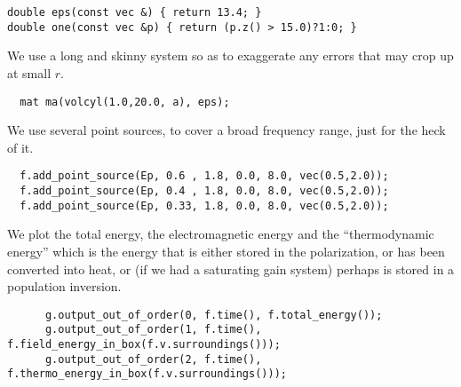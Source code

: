 \begin{verbatim}
double eps(const vec &) { return 13.4; }
double one(const vec &p) { return (p.z() > 15.0)?1:0; }
\end{verbatim}
\begin{comment}
int main(int argc, char **argv) {
  initialize mpi(argc, argv);
  deal_with_ctrl_c();
  const double ttot = 600.0;
\end{comment}
We use a long and skinny system so as to exaggerate any errors that may
crop up at small $r$.
\begin{verbatim}
  mat ma(volcyl(1.0,20.0, a), eps);
\end{verbatim}
\begin{comment}
  const char *dirname = make_output_directory(__FILE__);
  ma.set_output_directory(dirname);
  ma.add_polarizability(one, 0.25, 0.1, 3.0);
  fields f(&ma);
  grace g("energy", dirname);
\end{comment}
We use several point sources, to cover a broad frequency range, just for
the heck of it.
\begin{verbatim}
  f.add_point_source(Ep, 0.6 , 1.8, 0.0, 8.0, vec(0.5,2.0));
  f.add_point_source(Ep, 0.4 , 1.8, 0.0, 8.0, vec(0.5,2.0));
  f.add_point_source(Ep, 0.33, 1.8, 0.0, 8.0, vec(0.5,2.0));
\end{verbatim}
\begin{comment}
  double next_printtime = 50;
  while (f.time() < ttot && !interrupt) {
    if (f.time() >= next_printtime) {
      next_printtime += 50;
      master_printf("Working on time %
      master_printf("energy is %
\end{comment}
We plot the total energy, the electromagnetic energy and the
``thermodynamic energy'' which is the energy that is either stored in the
polarization, or has been converted into heat, or (if we had a saturating
gain system) perhaps is stored in a population inversion.
\begin{verbatim}
      g.output_out_of_order(0, f.time(), f.total_energy());
      g.output_out_of_order(1, f.time(), f.field_energy_in_box(f.v.surroundings()));
      g.output_out_of_order(2, f.time(), f.thermo_energy_in_box(f.v.surroundings()));
\end{verbatim}
\begin{comment}
    }
    f.step();
  }
}
\end{comment}

